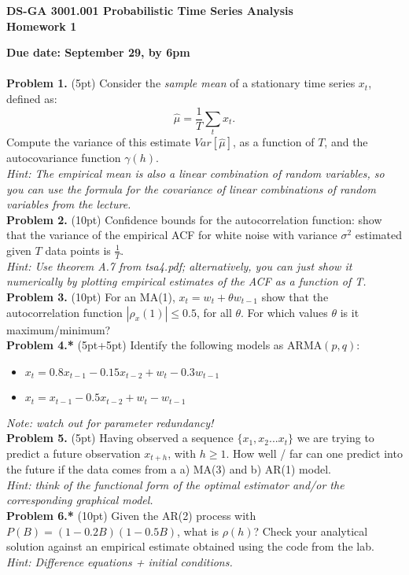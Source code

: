 \documentclass[12pt]{article}
\begin{document}
\thispagestyle{empty}
\begin{center}

\textbf{DS-GA 3001.001 Probabilistic Time Series Analysis\\
Homework 1}
\end{center}

\noindent \textbf{Due date: September 29, by 6pm}\\
\\
\noindent \textbf{Problem 1. }  (5pt) Consider the \emph{sample mean} of a stationary time series  $x_t$, defined as:
\begin{equation}
\hat{\mu} = \frac{1}{T} \sum_t x_t.
\end{equation}
Compute the variance of this estimate $Var[\hat{\mu}]$, as a function of $T$, and the autocovariance function $\gamma(h)$.\\
\emph{Hint: The empirical mean is also a linear combination of random variables, so you can use the formula for the covariance of linear combinations of random variables from the lecture. }\\

\noindent \textbf{Problem 2. } (10pt) Confidence bounds for the autocorrelation function: 
show that the variance of the empirical ACF for white noise with variance $\sigma^2$ estimated given $T$ data points is $\frac{1}{T}$.\\
\emph{Hint: Use theorem A.7 from tsa4.pdf; alternatively, you can just show it numerically by plotting empirical estimates of the ACF as a function of T. }\\

\noindent \textbf{Problem 3. } (10pt)
For an MA(1), $x_t = w_t + \theta w_{t-1}$ show that the autocorrelation function $|\rho_x(1) | \leq 0.5$, for all $\theta$. 
For which values $\theta$ is it maximum/minimum?\\

\noindent \textbf{Problem 4.*} (5pt+5pt) Identify the following models as $\mathrm{ARMA}(p,q)$:
\begin{itemize}
\item $x_t = 0.8 x_{t-1} - 0.15 x_{t-2} + w_t - 0.3 w_{t-1}$
\item $x_t =  x_{t-1} - 0.5 x_{t-2} + w_t - w_{t-1}$
\end{itemize}
\emph{Note: watch out for parameter redundancy!}\\

\noindent \textbf{Problem 5.} (5pt) Having observed a sequence  $\{x_1,x_2... x_t \}$ we are trying to predict a future observation $x_{t+h}$, with $h\geq1$.
How well / far can one predict into the future if the data comes from a a) MA(3) and b) AR(1) model. \\
\emph{Hint: think of the functional form of the optimal estimator and/or the corresponding graphical model.}\\

\noindent \textbf{Problem 6.*} (10pt) Given the AR(2) process with $P(B) = (1-0.2B)(1-0.5B)$, what is $\rho(h)$? 
 Check your analytical solution against an empirical estimate obtained using the code from the lab.\\
\emph{Hint: Difference equations + initial conditions.}\\
\end{document}
